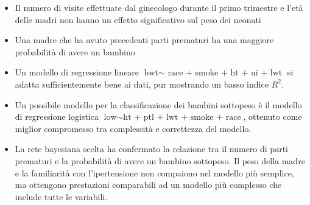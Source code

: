 \documentclass{article}\usepackage[]{graphicx}\usepackage[]{color}
\begin{document}
\begin{itemize}
\item Il numero di visite effettuate dal ginecologo durante il primo trimestre e l'età delle madri non hanno un effetto significativo sul peso dei neonati
\item Una madre che ha avuto precedenti parti prematuri ha una maggiore probabilità di avere un bambino 
\item Un modello di regressione lineare $\text{bwt} \sim \text{ race + smoke + ht + ui + lwt}$ si adatta sufficientemente bene ai dati, pur mostrando un basso indice $R^2$.
\item Un possibile modello per la classificazione dei bambini sottopeso è il modello di regressione logistica $\text{low} \sim \text{ht + ptl + lwt + smoke + race}$, ottenuto come miglior compromesso tra complessità e correttezza del modello.
\item La rete bayesiana scelta ha confermato la relazione tra il numero di parti prematuri e la probabilità di avere un bambino sottopeso. Il peso della madre e la familiarità con l'ipertensione non compaiono nel modello più semplice, ma ottengono prestazioni comparabili ad un modello più complesso che include tutte le variabili.
\end{itemize}
\end{document}
